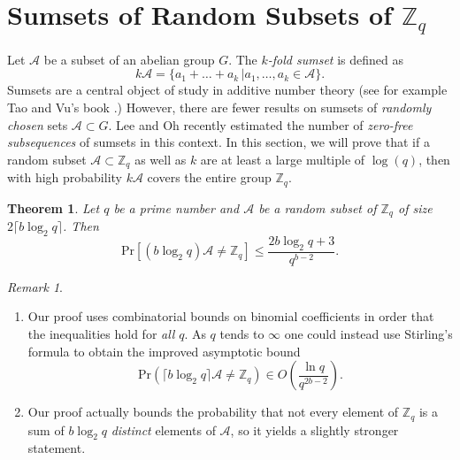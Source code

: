 \documentclass[11pt]{amsart}
\newtheorem{theorem}{Theorem}[section]
\theoremstyle{definition}
\theoremstyle{remark}
\newtheorem*{rem}{Remark}
\def\ZZ{\ensuremath{\mathbb{Z}}}
\def\cA{\ensuremath{\mathcal{A}}}
\def\Pr{\ensuremath{\mathrm{Pr}}}
\begin{document}

\section{Sumsets of Random Subsets of $\ZZ_q$}

Let $\cA$ be a subset of an abelian group $G$. The \emph{$k$-fold sumset} is defined as
\[ k \cA = \{ a_1 + \dots + a_k \, | a_1, \dots, a_k \in \cA \}. \]
Sumsets are a central object of study in additive number theory (see for example Tao and Vu's book \cite{TaoVu}.) However, there are fewer results on sumsets of \emph{randomly chosen} sets $\cA \subset G$. Lee and Oh \cite{LeeOh} recently estimated the number of \emph{zero-free subsequences} of sumsets in this context. In this section, we will prove that if a random subset $\cA \subset \ZZ_q$ as well as $k$ are at least a large multiple of $\log(q)$, then with high probability $k \cA$ covers the entire group $\ZZ_q$.

\begin{theorem} \label{thm:sumsets}
  Let $q$ be a prime number and $\cA$ be a random subset of $\ZZ_q$ of size $2 \lceil b \log_2 q \rceil$. Then 
  \[ \Pr[ \left( b \log_2 q \right) \cA \neq \ZZ_q] \leq \frac{2b \log_2 q + 3}{q^{b-2}}.\]

\end{theorem}

\begin{rem}
  \begin{enumerate}
    \item Our proof uses combinatorial bounds on binomial coefficients in order that the inequalities hold for \emph{all} $q$. As $q$ tends to $\infty$ one could instead use Stirling's formula to obtain the improved asymptotic bound
  \[ \Pr \left( \lceil b \log_2 q \rceil \cA \neq \ZZ_q \right) \in  O \left( \frac{\ln q}{q^{2b-2}} \right). \]

\item Our proof actually bounds the probability that not every element of $\ZZ_q$ is a sum of  $b \log_2 q$ \emph{distinct} elements of $\cA$, so it yields a slightly stronger statement.
 \end{enumerate}
\end{rem}
\end{document}
